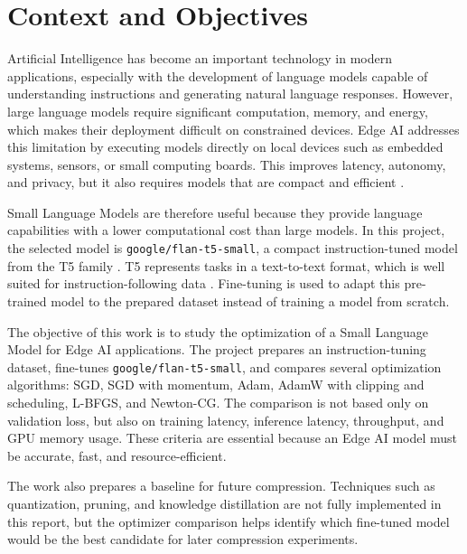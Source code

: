 \chapter{Context and Objectives}

\vspace*{0.3cm}

Artificial Intelligence has become an important technology in modern applications,
especially with the development of language models capable of understanding
instructions and generating natural language responses. However, large language
models require significant computation, memory, and energy, which makes their
deployment difficult on constrained devices. Edge AI addresses this limitation by
executing models directly on local devices such as embedded systems, sensors, or
small computing boards. This improves latency, autonomy, and privacy, but it also
requires models that are compact and efficient \cite{edgeai}.

Small Language Models are therefore useful because they provide language
capabilities with a lower computational cost than large models. In this project,
the selected model is \texttt{google/flan-t5-small}, a compact instruction-tuned
model from the T5 family \cite{flant5model}. T5 represents tasks in a
text-to-text format, which is well suited for instruction-following data
\cite{t5}. Fine-tuning is used to adapt this pre-trained model to the prepared
dataset instead of training a model from scratch.

The objective of this work is to study the optimization of a Small Language Model
for Edge AI applications. The project prepares an instruction-tuning dataset,
fine-tunes \texttt{google/flan-t5-small}, and compares several optimization
algorithms: SGD, SGD with momentum, Adam, AdamW with clipping and scheduling,
L-BFGS, and Newton-CG. The comparison is not based only on validation loss, but
also on training latency, inference latency, throughput, and GPU memory usage.
These criteria are essential because an Edge AI model must be accurate, fast, and
resource-efficient.

The work also prepares a baseline for future compression. Techniques such as
quantization, pruning, and knowledge distillation are not fully implemented in
this report, but the optimizer comparison helps identify which fine-tuned model
would be the best candidate for later compression experiments.

